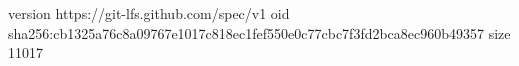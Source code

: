 version https://git-lfs.github.com/spec/v1
oid sha256:cb1325a76c8a09767e1017c818ec1fef550e0c77cbc7f3fd2bca8ec960b49357
size 11017
